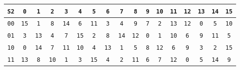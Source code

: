 \documentclass{article}
\begin{document}
\begin{center}
\vspace{10pt}
\begin{tabular}{|c|cccccccccccccccc|}
  \hline
\texttt{S2} & \texttt{0} & \texttt{1} & \texttt{2} & \texttt{3} & \texttt{4} & \texttt{5} & \texttt{6} & \texttt{7} & \texttt{8} & \texttt{9} & \texttt{10} & \texttt{11} & \texttt{12} & \texttt{13} & \texttt{14} & \texttt{15} \\
\hline
\texttt{00} & \texttt{1}\texttt{5} & \texttt{1} & \texttt{8} & \texttt{1}\texttt{4} & \texttt{6} & \texttt{1}\texttt{1} & \texttt{3} & \texttt{4} & \texttt{9} & \texttt{7} & \texttt{2} & \texttt{1}\texttt{3} & \texttt{1}\texttt{2} & \texttt{0} & \texttt{5} & \texttt{1}\texttt{0} \\
\texttt{01} & \texttt{3} & \texttt{1}\texttt{3} & \texttt{4} & \texttt{7} & \texttt{1}\texttt{5} & \texttt{2} & \texttt{8} & \texttt{1}\texttt{4} & \texttt{1}\texttt{2} & \texttt{0} & \texttt{1} & \texttt{1}\texttt{0} & \texttt{6} & \texttt{9} & \texttt{1}\texttt{1} & \texttt{5} \\
\texttt{10} & \texttt{0} & \texttt{1}\texttt{4} & \texttt{7} & \texttt{1}\texttt{1} & \texttt{1}\texttt{0} & \texttt{4} & \texttt{1}\texttt{3} & \texttt{1} & \texttt{5} & \texttt{8} & \texttt{1}\texttt{2} & \texttt{6} & \texttt{9} & \texttt{3} & \texttt{2} & \texttt{1}\texttt{5} \\
\texttt{11} & \texttt{1}\texttt{3} & \texttt{8} & \texttt{1}\texttt{0} & \texttt{1} & \texttt{3} & \texttt{1}\texttt{5} & \texttt{4} & \texttt{2} & \texttt{1}\texttt{1} & \texttt{6} & \texttt{7} & \texttt{1}\texttt{2} & \texttt{0} & \texttt{5} & \texttt{1}\texttt{4} & \texttt{9} \\
\hline
\end{tabular}


\end{center}
\end{document}
